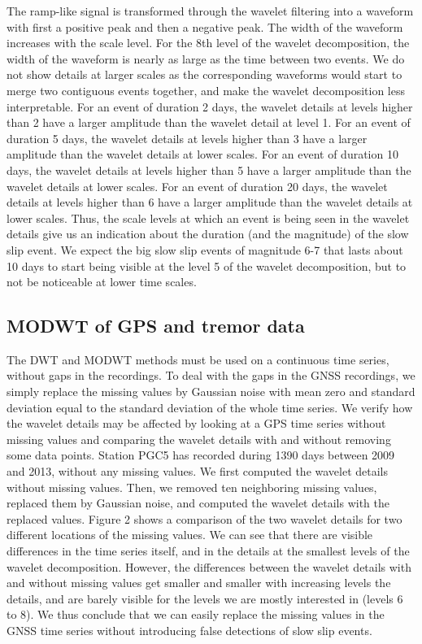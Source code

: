 \documentclass[draft]{agujournal2018}
\begin{document}
The ramp-like signal is transformed through the wavelet filtering into a waveform with first a positive peak and then a negative peak. The width of the waveform increases with the scale level. For the 8th level of the wavelet decomposition, the width of the waveform is nearly as large as the time between two events. We do not show details at larger scales as the corresponding waveforms would start to merge two contiguous events together, and make the wavelet decomposition less interpretable. For an event of duration 2 days, the wavelet details at levels higher than 2 have a larger amplitude than the wavelet detail at level 1. For an event of duration 5 days, the wavelet details at levels higher than 3 have a larger amplitude than the wavelet details at lower scales. For an event of duration 10 days, the wavelet details at levels higher than 5 have a larger amplitude than the wavelet details at lower scales. For an event of duration 20 days, the wavelet details at levels higher than 6 have a larger amplitude than the wavelet details at lower scales. Thus, the scale levels at which an event is being seen in the wavelet details give us an indication about the duration (and the magnitude) of the slow slip event. We expect the big slow slip events of magnitude 6-7 that lasts about 10 days to start being visible at the level 5 of the wavelet decomposition, but to not be noticeable at lower time scales. \\

\subsection{MODWT of GPS and tremor data}

The DWT and MODWT methods must be used on a continuous time series, without gaps in the recordings. To deal with the gaps in the GNSS recordings, we simply replace the missing values by Gaussian noise with mean zero and standard deviation equal to the standard deviation of the whole time series. We verify how the wavelet details may be affected by looking at a GPS time series without missing values and comparing the wavelet details with and without removing some data points. Station PGC5 has recorded during 1390 days between 2009 and 2013, without any missing values. We first computed the wavelet details without missing values. Then, we removed ten neighboring missing values, replaced them by Gaussian noise, and computed the wavelet details with the replaced values. Figure 2 shows a comparison of the two wavelet details for two different locations of the missing values. We can see that there are visible differences in the time series itself, and in the details at the smallest levels of the wavelet decomposition. However, the differences between the wavelet details with and without missing values get smaller and smaller with increasing levels the details, and are barely visible for the levels we are mostly interested in (levels 6 to 8). We thus conclude that we can easily replace the missing values in the GNSS time series without introducing false detections of slow slip events. \\
\end{document}
